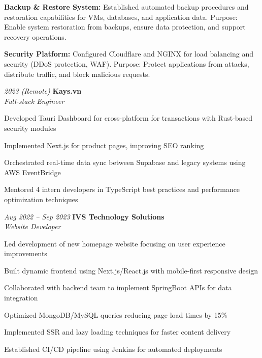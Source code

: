 \begin{onecolentry}
\begin{highlights}
        \item \textbf{Backup \& Restore System:} Established automated backup procedures and restoration capabilities for VMs, databases, and application data. Purpose: Enable system restoration from backups, ensure data protection, and support recovery operations.
        \item \textbf{Security Platform:} Configured Cloudflare and NGINX for load balancing and security (DDoS protection, WAF). Purpose: Protect applications from attacks, distribute traffic, and block malicious requests.
    \end{highlights}
\end{onecolentry}
\vspace{0.2 cm}

\begin{twocolentry}{\textit{2023 (Remote)}}
    \textbf{Kays.vn} \\[4pt]
    \textit{Full-stack Engineer}
\end{twocolentry}
\begin{onecolentry}
    \begin{highlights}
        \item Developed Tauri Dashboard for cross-platform for transactions with Rust-based security modules
        \item Implemented Next.js for product pages, improving SEO ranking
        \item Orchestrated real-time data sync between Supabase and legacy systems using AWS EventBridge
        \item Mentored 4 intern developers in TypeScript best practices and performance optimization techniques
    \end{highlights}
\end{onecolentry}
\vspace{0.2 cm}

\begin{twocolentry}{\textit{Aug 2022 -- Sep 2023}}
    \textbf{IVS Technology Solutions} \\[4pt]
    \textit{Website Developer}
\end{twocolentry}
\begin{onecolentry}
    \begin{highlights}
        \item Led development of new homepage website focusing on user experience improvements
        \item Built dynamic frontend using Next.js/React.js with mobile-first responsive design
        \item Collaborated with backend team to implement SpringBoot APIs for data integration
        \item Optimized MongoDB/MySQL queries reducing page load times by 15\%
        \item Implemented SSR and lazy loading techniques for faster content delivery
        \item Established CI/CD pipeline using Jenkins for automated deployments
    \end{highlights}
\end{onecolentry}

